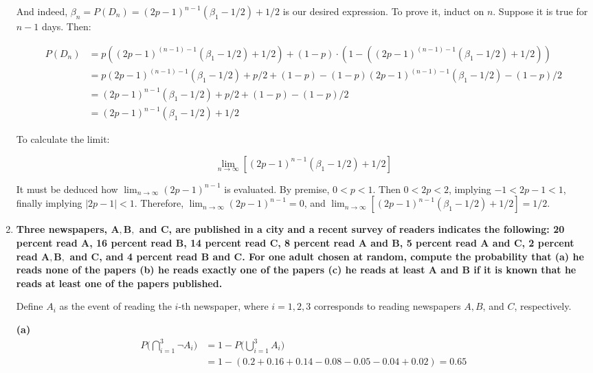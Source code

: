 \documentclass[10pt, oneside]{article}   	%
\theoremstyle{definition}
\begin{document}
\begin{enumerate}[label=3.\arabic*]
   And indeed, $\boxed{ \beta_n = P(D_n) = (2p - 1)^{n-1} (\beta_1 - 1/2) + 1/2}$ is our desired expression. To prove it, induct on $n$. Suppose it is true for $n-1$ days. Then:
   
   \begin{align*}
   P(D_n) &= p( (2p - 1)^{(n-1)-1} (\beta_1 - 1/2) + 1/2 ) + (1-p) \cdot (1 - ( (2p - 1)^{(n-1) -1} (\beta_1 - 1/2) + 1/2 )) \\
   &= p (2p - 1)^{(n-1)-1} (\beta_1 - 1/2) + p/2 + (1-p) - (1-p) (2p - 1)^{(n-1) -1} (\beta_1 - 1/2) - (1-p)/2 \\
   &= (2p - 1)^{n-1} (\beta_1 - 1/2) + p/2 + (1-p ) - (1-p)/2 \\
   &= (2p - 1)^{n-1} (\beta_1 - 1/2) + 1/2
   \end{align*}
   
   To calculate the limit:
   
   \[ \lim_{n \rightarrow \infty} [ (2p - 1)^{n-1} (\beta_1 - 1/2) + 1/2 ]  \]
   
   It must be deduced how $\lim_{n \rightarrow \infty} (2p - 1)^{n-1}$ is evaluated. By premise, $0 < p < 1$. Then $0 < 2p < 2$, implying $-1 < 2p - 1 < 1$, finally implying $|2p - 1| < 1$. Therefore, $\lim_{n \rightarrow \infty} (2p - 1)^{n-1} = 0$, and $\lim_{n \rightarrow \infty} [ (2p - 1)^{n-1} (\beta_1 - 1/2) + 1/2 ] = \boxed{1/2}$.

\item  \begin{tcolorbox}[
  colback=Cerulean!5!white,
  colframe=Cerulean!75!black]
\textbf{Three newspapers, $\bm{A, B,}$ and $\bm{C}$, are published in a city and a recent survey of readers indicates the following: 20 percent read $\bm{A}$, 16 percent read $\bm{B}$, 14 percent read $\bm{C}$, 8 percent read $\bm{A}$ and $\bm{B}$, 5 percent read $\bm{A}$ and $\bm{C}$, 2 percent read $\bm{A, B,}$ and $\bm{C}$, and 4 percent read $\bm{B}$ and $\bm{C}$. For one adult chosen at random, compute the probability that (a) he reads none of the papers (b) he reads exactly one of the papers (c) he reads at least $\bm{A}$ and $\bm{B}$ if it is known that he reads at least one of the papers published.}
\end{tcolorbox}

Define $A_i$ as the event of reading the $i$-th newspaper, where $i = 1, 2, 3$ corresponds to reading newspapers $A, B$, and $C$, respectively.

\textbf{(a)} 
\begin{align*}
P\Bigg( \bigcap^3_{i = 1} \neg A_i \Bigg) &= 1 - P \Bigg( \bigcup^3_{i = 1} A_i \Bigg) \\
&= 1 - (0.2 + 0.16 + 0.14 - 0.08 - 0.05 - 0.04 + 0.02) = \boxed{0.65}
\end{align*}


\end{enumerate}
\end{document}
